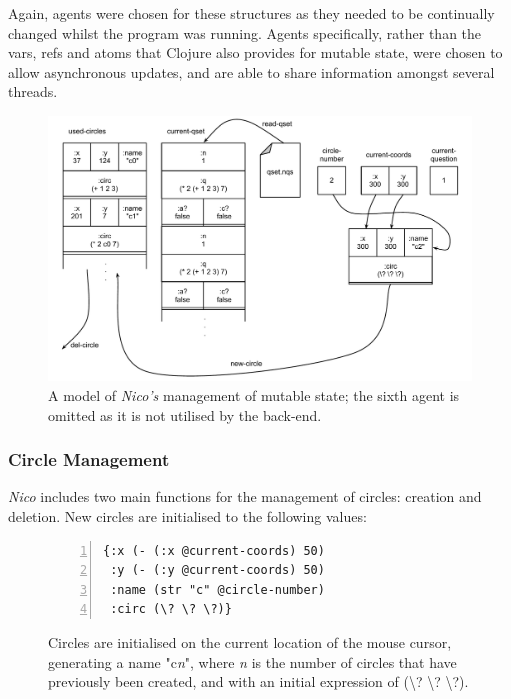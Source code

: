 \documentclass[12pt,twoside,notitlepage,xetex]{report}
\begin{document}
Again, agents were chosen for these structures as they needed to be continually
changed whilst the program was running.  Agents specifically, rather than the
vars, refs and atoms that Clojure also provides for mutable state, were chosen
to allow asynchronous updates, and are able to share information amongst
several threads. \cite{Halloway2009}

\begin{center}
\begin{figure}[H]
\begin{center}
\includegraphics[width=\textwidth-2cm]{figs/nico_backend.pdf}
\end{center}
\caption{A model of \emph{Nico's} management of mutable state; the sixth agent is omitted as it is not utilised by the back-end.}
\end{figure}
\end{center}

\subsubsection{Circle Management}

\emph{Nico} includes two main functions for the management of circles: creation and deletion.  New circles are initialised to the following values:

\begin{center}
\begin{figure}[H]
\begin{center}
\begin{minipage}{2.5in}%
\begin{Verbatim}[fontsize=\small,numbers=left]
{:x (- (:x @current-coords) 50)
 :y (- (:y @current-coords) 50)
 :name (str "c" @circle-number)
 :circ (\? \? \?)}
\end{Verbatim}
\end{minipage}
\end{center}
\caption{Circles are initialised on the current location of the mouse cursor, generating a name {\ttfamily "c}\emph{n}{\ttfamily "}, where \emph{n} is the number of circles that have previously been created, and with an initial expression of {\ttfamily (\textbackslash? \textbackslash? \textbackslash?)}.}
\end{figure}
\end{center}
\end{document}
